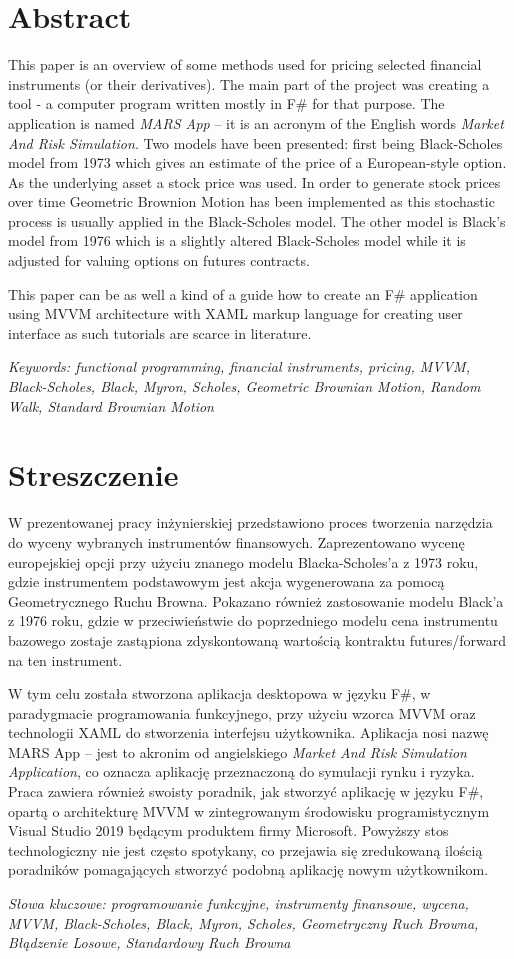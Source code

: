\chapter*{Abstract}%
%
    This paper is an overview of some methods used for pricing selected financial instruments (or their derivatives). The main part of the project was creating a tool - a computer program written mostly in F\# for that purpose. The application is named \textit{MARS App} -- it is an acronym  of the English words \textit{Market And Risk Simulation}. Two models have been presented: first being Black-Scholes model from 1973 which gives an estimate of the price of a European-style option. As the underlying asset a stock price was used. In order to generate stock prices over time Geometric Brownion Motion has been implemented as this stochastic process is usually applied in the Black-Scholes model. The other model is Black's model from 1976 which is a slightly altered Black-Scholes model while it is adjusted for valuing options on futures contracts.
    
    This paper can be as well a kind of a guide how to create an F\# application using MVVM architecture with XAML markup language for creating user interface as such tutorials are scarce in literature.
    
    \emph{Keywords: functional programming, financial instruments, pricing, MVVM, Black-Scholes, Black, Myron, Scholes, Geometric Brownian Motion, Random Walk, Standard Brownian Motion}

\chapter*{Streszczenie}%
%
    W prezentowanej pracy inżynierskiej przedstawiono proces tworzenia narzędzia do wyceny wybranych instrumentów finansowych. Zaprezentowano wycenę europejskiej opcji przy użyciu znanego modelu Blacka-Scholes'a z 1973 roku, gdzie instrumentem podstawowym jest akcja wygenerowana za pomocą Geometrycznego Ruchu Browna. Pokazano również zastosowanie modelu Black'a z 1976 roku, gdzie w przeciwieństwie do poprzedniego modelu cena instrumentu bazowego zostaje zastąpiona zdyskontowaną wartością kontraktu futures/forward na ten instrument.
    
    W tym celu została stworzona aplikacja desktopowa w języku F\#, w paradygmacie programowania funkcyjnego, przy użyciu wzorca MVVM oraz technologii XAML do stworzenia interfejsu użytkownika. Aplikacja nosi nazwę MARS App -- jest to akronim od angielskiego \textit{Market And Risk Simulation Application}, co oznacza aplikację przeznaczoną do symulacji rynku i ryzyka. Praca zawiera również swoisty poradnik, jak stworzyć aplikację w języku F\#, opartą o architekturę MVVM w zintegrowanym środowisku programistycznym Visual Studio 2019 będącym produktem firmy Microsoft. Powyższy stos technologiczny nie jest często spotykany, co przejawia się zredukowaną ilością poradników pomagających stworzyć podobną aplikację nowym użytkownikom.
    
    \emph{Słowa kluczowe: programowanie funkcyjne, instrumenty finansowe, wycena, MVVM, Black-Scholes, Black, Myron, Scholes, Geometryczny Ruch Browna, Błądzenie Losowe, Standardowy Ruch Browna}